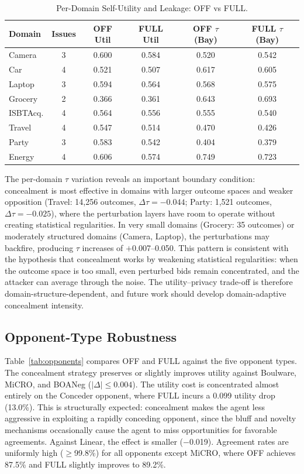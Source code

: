 \documentclass[runningheads]{llncs}
\begin{document}
\begin{table}[t]
\centering
\caption{Per-Domain Self-Utility and Leakage: OFF vs FULL.}
\label{tab:domain}
\small
\renewcommand{\arraystretch}{1.15}
\begin{tabular}{lccccc}
\toprule
\textbf{Domain} & \textbf{Issues} & \textbf{OFF Util} & \textbf{FULL Util} & \textbf{OFF $\tau$ (Bay)} & \textbf{FULL $\tau$ (Bay)} \\
\midrule
Camera     & 3 & 0.600 & 0.584 & 0.520 & 0.542 \\
Car        & 4 & 0.521 & 0.507 & 0.617 & 0.605 \\
Laptop     & 3 & 0.594 & 0.564 & 0.568 & 0.575 \\
Grocery    & 2 & 0.366 & 0.361 & 0.643 & 0.693 \\
ISBTAcq.   & 4 & 0.564 & 0.556 & 0.555 & 0.540 \\
Travel     & 4 & 0.547 & 0.514 & 0.470 & 0.426 \\
Party      & 3 & 0.583 & 0.542 & 0.404 & 0.379 \\
Energy     & 4 & 0.606 & 0.574 & 0.749 & 0.723 \\
\bottomrule
\end{tabular}
\end{table}

The per-domain $\tau$ variation reveals an important boundary condition: concealment is most effective in domains with larger outcome spaces and weaker opposition (Travel: 14,256 outcomes, $\Delta\tau = -0.044$; Party: 1,521 outcomes, $\Delta\tau = -0.025$), where the perturbation layers have room to operate without creating statistical regularities. In very small domains (Grocery: 35 outcomes) or moderately structured domains (Camera, Laptop), the perturbations may backfire, producing $\tau$ increases of $+$0.007--0.050. This pattern is consistent with the hypothesis that concealment works by weakening statistical regularities: when the outcome space is too small, even perturbed bids remain concentrated, and the attacker can average through the noise. The utility--privacy trade-off is therefore domain-structure-dependent, and future work should develop domain-adaptive concealment intensity.

\subsection{Opponent-Type Robustness}

Table~\ref{tab:opponents} compares OFF and FULL against the five opponent types.
The concealment strategy preserves or slightly improves utility against Boulware, MiCRO, and BOANeg ($|\Delta| \leq 0.004$). The utility cost is concentrated almost entirely on the Conceder opponent, where FULL incurs a 0.099 utility drop (13.0\%). This is structurally expected: concealment makes the agent less aggressive in exploiting a rapidly conceding opponent, since the bluff and novelty mechanisms occasionally cause the agent to miss opportunities for favorable agreements. Against Linear, the effect is smaller ($-$0.019). Agreement rates are uniformly high ($\geq$99.8\%) for all opponents except MiCRO, where OFF achieves 87.5\% and FULL slightly improves to 89.2\%.
\end{document}
